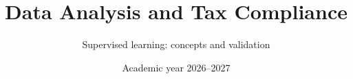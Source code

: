\documentclass[11pt,aspectratio=169]{beamer}
\title{Data Analysis and Tax Compliance}
\subtitle{Supervised learning: concepts and validation}
\date{Academic year 2026--2027}
\begin{document}
\begin{frame}\titlepage\end{frame}

\end{document}
